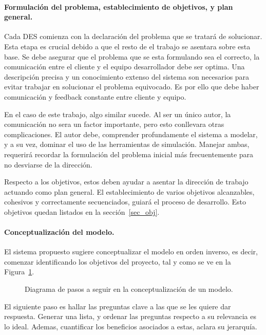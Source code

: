 \paragraph{Formulación del problema, establecimiento de objetivos, y plan general.}

Cada DES comienza con la declaración del problema que se tratará de solucionar.
Esta etapa es crucial debido a que el resto de el trabajo se asentara sobre esta base.
Se debe asegurar que el problema que se esta formulando sea el correcto,
la comunicación entre el cliente y el equipo desarrollador debe ser optima.
Una descripción precisa y un conocimiento extenso del sistema son necesarios para evitar
trabajar en solucionar el problema equivocado.
Es por ello que debe haber comunicación y feedback constante entre cliente y equipo.

En el caso de este trabajo, algo similar sucede.
Al ser un único autor, la comunicación no sera un factor importante,
pero esto conllevara otras complicaciones.
El autor debe, comprender profundamente el sistema a modelar, y a su vez,
dominar el uso de las herramientas de simulación.
Manejar ambas, requerirá recordar la formulación del problema inicial
más frecuentemente para no desviarse de la dirección.

Respecto a los objetivos, estos deben ayudar a asentar la dirección de trabajo actuando como plan general.
El establecimiento de varios objetivos alcanzables, cohesivos y correctamente secuenciados,
guiará el proceso de desarrollo.
Esto objetivos quedan listados en la sección~\ref{sec_obj}.

\paragraph{Conceptualización del modelo.}\label{sec:modelconcept}

El sistema propuesto sugiere conceptualizar el modelo en orden inverso,
es decir, comenzar identificando los objetivos del proyecto,
tal y como se ve en la Figura~\ref{fig:2_fc_model_concept}.

\begin{figure}[h]
	\begin{center}
		
	\end{center}
	\caption{Diagrama de pasos a seguir en la conceptualización de un modelo.}
	\label{fig:2_fc_model_concept}
\end{figure}

El siguiente paso es hallar las preguntas clave a las que
se les quiere dar respuesta.
Generar una lista, y ordenar las preguntas respecto a su relevancia es lo ideal.
Ademas, cuantificar los beneficios asociados a estas, aclara su jerarquía.

